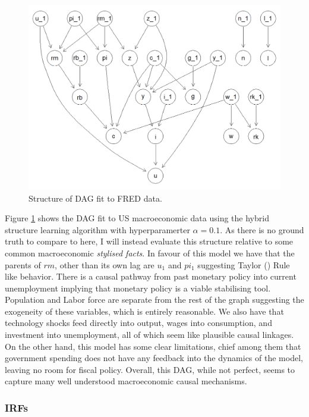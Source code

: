 \documentclass{article}
\begin{document}
\begin{figure}
  \centering
  \includegraphics[width=\linewidth]{images/real_hybrid_structure.png}
  \caption{Structure of DAG fit to FRED data.}
  \label{freddag}
\end{figure}

Figure \ref{freddag} shows the DAG fit to US macroeconomic data using the hybrid structure learning algorithm with hyperparamerter $\alpha = 0.1$. As there is no ground truth to compare to here, I will instead evaluate this structure relative to some common macroeconomic \textit{stylised facts}. In favour of this model we have that the parents of $rm$, other than its own lag are $u_1$ and $pi_1$ suggesting Taylor (\citeyear{taylor1993discretion}) Rule like behavior. There is a causal pathway from past monetary policy into current unemployment implying that monetary policy is a viable stabilising tool. Population and Labor force are separate from the rest of the graph suggesting the exogeneity of these variables, which is entirely reasonable. We also have that technology shocks feed directly into output, wages into consumption, and investment into unemployment, all of which seem like plausible causal linkages. On the other hand, this model has some clear limitations, chief among them that government spending does not have any feedback into the dynamics of the model, leaving no room for fiscal policy. Overall, this DAG, while not perfect, seems to capture many well understood macroeconomic causal mechanisms.

\subsubsection{IRFs}
\end{document}

